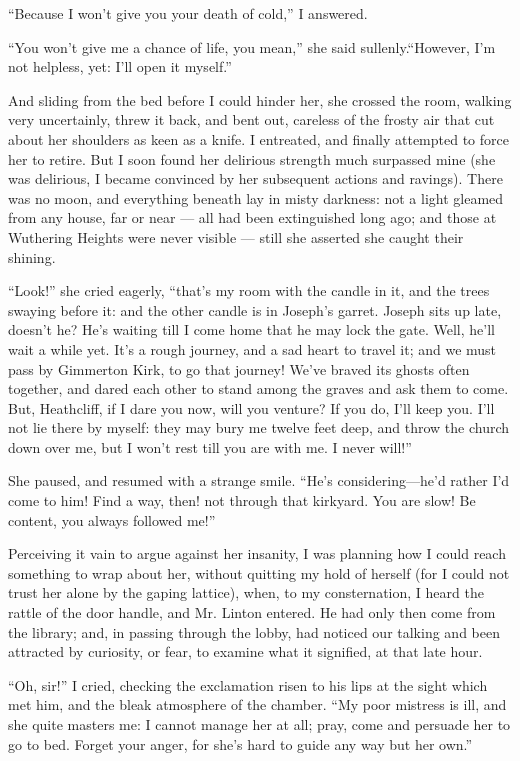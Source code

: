 \par “Because I won't give you your death of cold,” I answered.
\par “You won't give me a chance of life, you mean,” she said sullenly.“However, I'm not helpless, yet: I'll open it myself.”
\par And sliding from the bed before I could hinder her, she crossed the room, walking very uncertainly, threw it back, and bent out, careless of the frosty air that cut about her shoulders as keen as a knife. I entreated, and finally attempted to force her to retire. But I soon found her delirious strength much surpassed mine (she was delirious, I became convinced by her subsequent actions and ravings). There was no moon, and everything beneath lay in misty darkness: not a light gleamed from any house, far or near — all had been extinguished long ago; and those at Wuthering Heights were never visible — still she asserted she caught their shining.
\par “Look!” she cried eagerly, “that's my room with the candle in it, and the trees swaying before it: and the other candle is in Joseph's garret. Joseph sits up late, doesn't he? He's waiting till I come home that he may lock the gate. Well, he'll wait a while yet. It's a rough journey, and a sad heart to travel it; and we must pass by Gimmerton Kirk, to go that journey! We've braved its ghosts often together, and dared each other to stand among the graves and ask them to come. But, Heathcliff, if I dare you now, will you venture? If you do, I'll keep you. I'll not lie there by myself: they may bury me twelve feet deep, and throw the church down over me, but I won't rest till you are with me. I never will!”
\par She paused, and resumed with a strange smile. “He's considering—he'd rather I'd come to him! Find a way, then! not through that kirkyard. You are slow! Be content, you always followed me!”
\par Perceiving it vain to argue against her insanity, I was planning how I could reach something to wrap about her, without quitting my hold of herself (for I could not trust her alone by the gaping lattice), when, to my consternation, I heard the rattle of the door handle, and Mr. Linton entered. He had only then come from the library; and, in passing through the lobby, had noticed our talking and been attracted by curiosity, or fear, to examine what it signified, at that late hour.
\par “Oh, sir!” I cried, checking the exclamation risen to his lips at the sight which met him, and the bleak atmosphere of the chamber. “My poor mistress is ill, and she quite masters me: I cannot manage her at all; pray, come and persuade her to go to bed. Forget your anger, for she's hard to guide any way but her own.”

